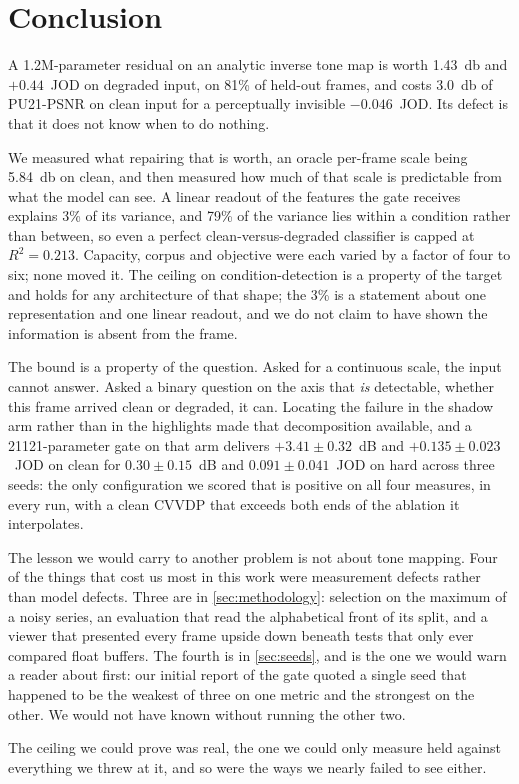 \section{Conclusion}
\label{sec:conclusion}

A \num{1.2}M-parameter residual on an analytic inverse tone map is worth
\SI{+1.43}{\decibel} and $+0.44$~JOD on degraded input, on 81\% of held-out
frames, and costs \SI{3.0}{\decibel} of PU21-PSNR on clean input for a
perceptually invisible $-0.046$~JOD. Its defect is that it does not know when to
do nothing.

We measured what repairing that is worth, an oracle per-frame scale being
\SI{+5.84}{\decibel} on clean, and then measured how much of that scale is
predictable from what the model can see. A linear readout of the features the
gate receives explains 3\% of its variance, and 79\% of the variance lies within
a condition rather than between, so even a perfect clean-versus-degraded
classifier is capped at $R^2 = \num{0.213}$. Capacity, corpus and objective were
each varied by a factor of four to six; none moved it. The ceiling on
condition-detection is a property of the target and holds for any architecture
of that shape; the 3\% is a statement about one representation and one linear
readout, and we do not claim to have shown the information is absent from the
frame.

The bound is a property of the question. Asked for a continuous scale, the input
cannot answer. Asked a binary question on the axis that \emph{is} detectable,
whether this frame arrived clean or degraded, it can. Locating the failure in
the shadow arm rather than in the highlights made that decomposition available,
and a \num{21121}-parameter gate on that arm delivers
$+3.41 \pm 0.32$~dB and $+0.135 \pm 0.023$~JOD on clean for
$0.30 \pm 0.15$~dB and $0.091 \pm 0.041$~JOD on hard across three seeds:
the only configuration we scored that is positive on all four measures, in every
run, with a clean CVVDP that exceeds both ends of the ablation it interpolates.

The lesson we would carry to another problem is not about tone mapping. Four of
the things that cost us most in this work were measurement defects rather than
model defects. Three are in \cref{sec:methodology}: selection on the maximum of
a noisy series, an evaluation that read the alphabetical front of its split, and
a viewer that presented every frame upside down beneath tests that only ever
compared float buffers. The fourth is in \cref{sec:seeds}, and is the one we
would warn a reader about first: our initial report of the gate quoted a single
seed that happened to be the weakest of three on one metric and the strongest on
the other. We would not have known without running the other two.

The ceiling we could prove was real, the one we could only measure held against
everything we threw at it, and so were the ways we nearly failed to see either.
